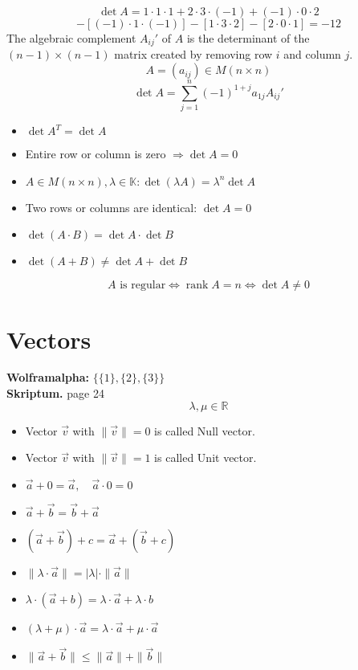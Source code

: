 \documentclass[a4paper,twocolumn]{article}
\DeclareMathOperator{\rank}{rank}
\newcommand{\wa}[1]{\textbf{Wolframalpha:} $#1$ \\}
\newcommand{\scriptref}[1]{\textbf{Skriptum.} page #1 \\}
\begin{document}
\[
    \det{A} = 1\cdot 1\cdot 1 + 2\cdot 3\cdot(-1) + (-1)\cdot 0\cdot 2
\] \[
    - [(-1) \cdot 1 \cdot (-1)] - [1\cdot 3\cdot 2] - [2\cdot 0\cdot 1]
    = -12
\]
%
The algebraic complement $A_{ij}'$ of $A$ is the determinant
of the $(n-1)\times(n-1)$ matrix created by removing row $i$
and column $j$.
%
\[
    A = (a_{ij}) \in M(n\times n)
\] \[
    \det{A} = \sum_{j=1}^n (-1)^{1+j} a_{1j} A_{ij}'
\]
%
\begin{itemize}
  \item $\det{A^T} = \det{A}$
  \item Entire row or column is zero $\Rightarrow \det{A} = 0$
  \item $A\in M(n\times n), \lambda \in \mathbb{K}:
        \det{(\lambda A)} = \lambda^n \det{A}$
  \item Two rows or columns are identical: $\det{A} = 0$
  \item $\det{(A\cdot B)} = \det{A}\cdot\det{B}$
  \item $\det{(A + B)} \neq \det{A} + \det{B}$
\end{itemize}
%
\[
    A \text{ is regular}
    \Leftrightarrow
    \rank{A} = n
    \Leftrightarrow
    \det{A} \neq 0
\]

\section{Vectors}

\wa{\{\{1\},\{2\},\{3\}\}}
\scriptref{24}
%
\[
    \lambda, \mu \in \mathbb{R}
\]
%
\begin{itemize}
  \item Vector $\vec{v}$ with $\|\vec{v}\| = 0$ is called Null vector.
  \item Vector $\vec{v}$ with $\|\vec{v}\| = 1$ is called Unit vector.
  \item $\vec{a} + 0 = \vec{a}, \quad \vec{a} \cdot 0 = 0$
  \item $\vec{a} + \vec{b} = \vec{b} + \vec{a}$
  \item $(\vec{a} + \vec{b}) + c = \vec{a} + (\vec{b} + c)$
  \item $\|\lambda\cdot \vec{a}\| = |\lambda| \cdot \|\vec{a}\|$
  \item $\lambda\cdot (\vec{a} + b) = \lambda\cdot \vec{a} + \lambda\cdot b$
  \item $(\lambda + \mu)\cdot \vec{a} = \lambda\cdot \vec{a}
        + \mu\cdot \vec{a}$
  \item $\|\vec{a} + \vec{b}\| \leq \|\vec{a}\| + \|\vec{b}\|$
\end{itemize}
\end{document}
